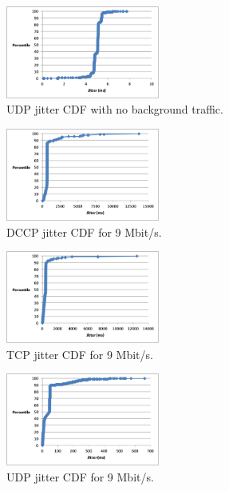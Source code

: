 \documentclass[9pt,twocolumn]{article}
\begin{document}
\begin{figure}[h]
   \centering
      \includegraphics[width=0.45\textwidth]{pics/udp_none_jitter}
   \caption{UDP jitter CDF with no background traffic.}
\label{fig:udp_none_jitter}
\end{figure}

\begin{figure}[h]
   \centering
      \includegraphics[width=0.45\textwidth]{pics/dccp_9_jitter_new}
   \caption{DCCP jitter CDF for 9 Mbit/s.}
\label{fig:dccp_9_jitter}
\end{figure}

\begin{figure}[h]
   \centering
      \includegraphics[width=0.45\textwidth]{pics/tcp_9_jitter}
   \caption{TCP jitter CDF for 9 Mbit/s.}
\label{fig:tcp_9_jitter}
\end{figure}

\begin{figure}[h]
   \centering
      \includegraphics[width=0.45\textwidth]{pics/udp_9_jitter}
   \caption{UDP jitter CDF for 9 Mbit/s.}
\label{fig:udp_9_jitter}
\end{figure}
\end{document}
